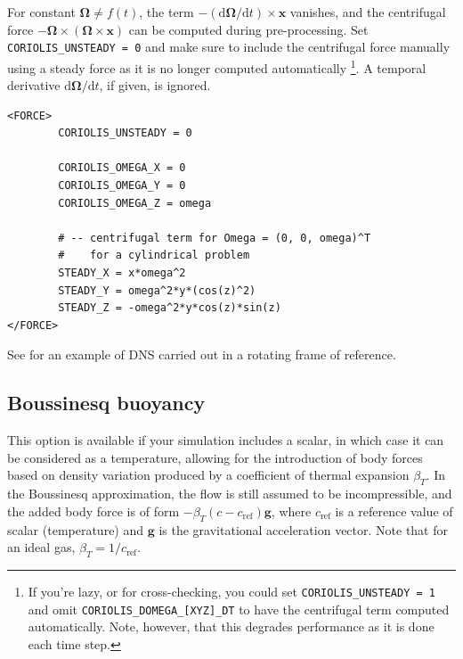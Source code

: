\documentclass[11pt]{report}
\newcommand\cd{\mathrm{d}} \newcommand\cD{\mathrm{D}}
\begin{document}
\noindent 
For constant $\bm{\Omega}\neq f(t)$, the term
$-(\cd\bm{\Omega}/\cd t)\times\bm{x}$ vanishes, and the centrifugal
force $-\bm{\Omega} \times (\bm{\Omega} \times \bm{x})$ can be
computed during pre-processing.
%
Set \verb|CORIOLIS_UNSTEADY = 0| and make sure to include the centrifugal
force manually using a steady force as it is no longer computed automatically%
\footnote{If you're lazy, or for cross-checking, you could set
  \texttt{CORIOLIS\_UNSTEADY = 1} and omit
  \texttt{CORIOLIS\_DOMEGA\_[XYZ]\_DT} to have the centrifugal term
  computed automatically. Note, however, that this degrades
  performance as it is done each time step.}.  A temporal derivative
$\cd\bm{\Omega}/\cd t$, if given, is ignored.

\begin{verbatim}
<FORCE>
        CORIOLIS_UNSTEADY = 0

        CORIOLIS_OMEGA_X = 0
        CORIOLIS_OMEGA_Y = 0
        CORIOLIS_OMEGA_Z = omega

        # -- centrifugal term for Omega = (0, 0, omega)^T
        #    for a cylindrical problem
        STEADY_X = x*omega^2
        STEADY_Y = omega^2*y*(cos(z)^2)
        STEADY_Z = -omega^2*y*cos(z)*sin(z)
</FORCE>
\end{verbatim}


See \citet{ablmm15} for an example of DNS carried out in a rotating
frame of reference.

\subsection{Boussinesq buoyancy}
\label{sec.bous}

This option is available if your simulation includes a scalar, in
which case it can be considered as a temperature, allowing for the
introduction of body forces based on density variation produced by a
coefficient of thermal expansion $\beta_T$.  In the Boussinesq
approximation, the flow is still assumed to be incompressible, and the
added body force is of form $-\beta_T(c-c_\textrm{ref})\bm{g}$, where
$c_\textrm{ref}$ is a reference value of scalar (\ie temperature) and
$\bm{g}$ is the gravitational acceleration vector.  Note that for an
ideal gas, $\beta_T=1/c_\textrm{ref}$.
\end{document}

